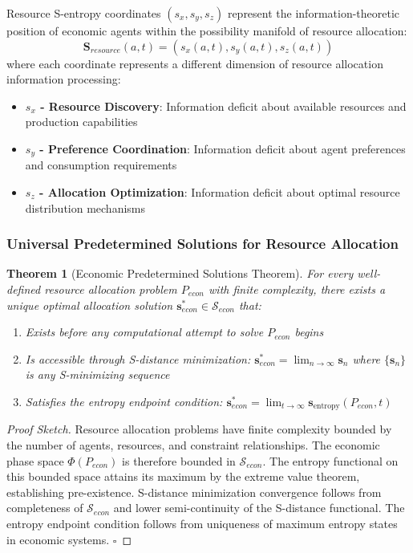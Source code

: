 \documentclass[12pt,a4paper]{article}
\newtheorem{theorem}{Theorem}
\begin{document}
Resource S-entropy coordinates $(s_x, s_y, s_z)$ represent the information-theoretic position of economic agents within the possibility manifold of resource allocation:
\begin{equation}
\mathbf{S}_{resource}(a,t) = (s_x(a,t), s_y(a,t), s_z(a,t))
\end{equation}
where each coordinate represents a different dimension of resource allocation information processing:
\begin{itemize}
\item \textbf{$s_x$ - Resource Discovery}: Information deficit about available resources and production capabilities
\item \textbf{$s_y$ - Preference Coordination}: Information deficit about agent preferences and consumption requirements  
\item \textbf{$s_z$ - Allocation Optimization}: Information deficit about optimal resource distribution mechanisms
\end{itemize}

\subsubsection{Universal Predetermined Solutions for Resource Allocation}

\begin{theorem}[Economic Predetermined Solutions Theorem]
For every well-defined resource allocation problem $P_{econ}$ with finite complexity, there exists a unique optimal allocation solution $\mathbf{s}^*_{econ} \in \mathcal{S}_{econ}$ that:
\begin{enumerate}
\item Exists before any computational attempt to solve $P_{econ}$ begins
\item Is accessible through S-distance minimization: $\mathbf{s}^*_{econ} = \lim_{n \to \infty} \mathbf{s}_n$ where $\{\mathbf{s}_n\}$ is any S-minimizing sequence
\item Satisfies the entropy endpoint condition: $\mathbf{s}^*_{econ} = \lim_{t \to \infty} \mathbf{s}_{\text{entropy}}(P_{econ}, t)$
\end{enumerate}
\end{theorem}

\begin{proof}[Proof Sketch]
Resource allocation problems have finite complexity bounded by the number of agents, resources, and constraint relationships. The economic phase space $\Phi(P_{econ})$ is therefore bounded in $\mathcal{S}_{econ}$. The entropy functional on this bounded space attains its maximum by the extreme value theorem, establishing pre-existence. S-distance minimization convergence follows from completeness of $\mathcal{S}_{econ}$ and lower semi-continuity of the S-distance functional. The entropy endpoint condition follows from uniqueness of maximum entropy states in economic systems. $\square$
\end{proof}
\end{document}
